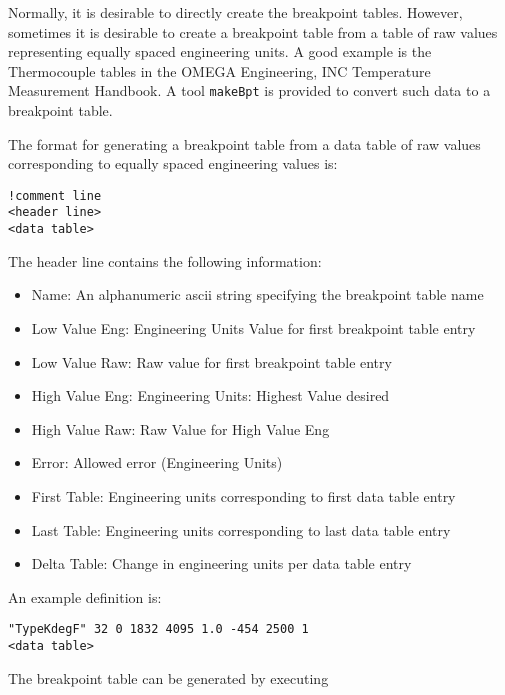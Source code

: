 Normally, it is desirable to directly create the breakpoint tables. However, sometimes it is desirable to create a breakpoint 
table from a table of raw values representing equally spaced engineering units. A good example is the Thermocouple 
tables in the OMEGA Engineering, INC Temperature Measurement Handbook. A tool \verb|makeBpt| is provided to convert 
such data to a breakpoint table.

The format for generating a breakpoint table from a data table of raw values corresponding to equally spaced engineering 
values is:

\begin{verbatim}!comment line
<header line>
<data table>
\end{verbatim}The header line contains the following information:

\begin{itemize}\item Name: An alphanumeric ascii string specifying the breakpoint table name

\item Low Value Eng: Engineering Units Value for first breakpoint table entry

\item Low Value Raw: Raw value for first breakpoint table entry

\item High Value Eng: Engineering Units: Highest Value desired

\item High Value Raw: Raw Value for High Value Eng

\item Error: Allowed error (Engineering Units)

\item First Table: Engineering units corresponding to first data table entry

\item Last Table: Engineering units corresponding to last data table entry

\item Delta Table: Change in engineering units per data table entry

\end{itemize} An example definition is:

\begin{verbatim}"TypeKdegF" 32 0 1832 4095 1.0 -454 2500 1
<data table>
\end{verbatim}The breakpoint table can be generated by executing

